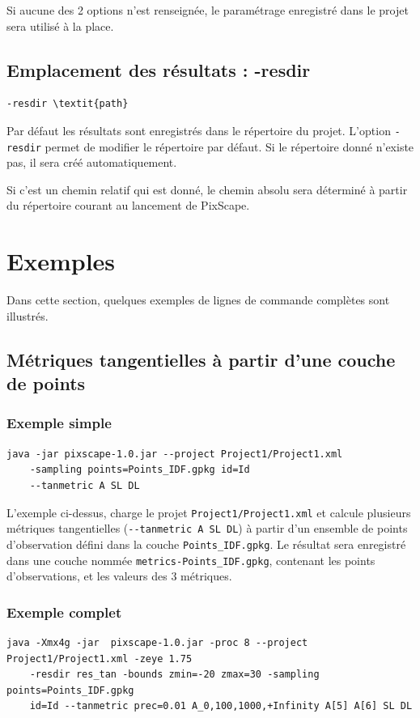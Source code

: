 \documentclass{report}
\begin{document}
Si aucune des 2 options n'est renseignée, le paramétrage enregistré dans le projet sera utilisé à la place.

\subsection{Emplacement des résultats : -resdir}
\begin{Verbatim}[commandchars=\\\{\}]
-resdir \textit{path}
\end{Verbatim}
Par défaut les résultats sont enregistrés dans le répertoire du projet. L'option \verb|-resdir| permet de modifier le répertoire par défaut. 
Si le répertoire donné n'existe pas, il sera créé automatiquement.

Si c'est un chemin relatif qui est donné, le chemin absolu sera déterminé à partir du répertoire courant au lancement de PixScape.

\section{Exemples}

Dans cette section, quelques exemples de lignes de commande complètes sont illustrés.

\subsection{Métriques tangentielles à partir d'une couche de points}
\subsubsection{Exemple simple}
\begin{Verbatim}
java -jar pixscape-1.0.jar --project Project1/Project1.xml 
	-sampling points=Points_IDF.gpkg id=Id 
	--tanmetric A SL DL
\end{Verbatim}

L'exemple ci-dessus, charge le projet \verb|Project1/Project1.xml| et calcule plusieurs métriques tangentielles (\verb|--tanmetric A SL DL|) à partir d'un ensemble de points d'observation défini dans la couche \verb|Points_IDF.gpkg|. Le résultat sera enregistré dans une couche nommée \verb|metrics-Points_IDF.gpkg|, contenant les points d'observations, et les valeurs des 3 métriques.

\subsubsection{Exemple complet}
\begin{Verbatim}
java -Xmx4g -jar  pixscape-1.0.jar -proc 8 --project Project1/Project1.xml -zeye 1.75
	-resdir res_tan -bounds zmin=-20 zmax=30 -sampling points=Points_IDF.gpkg 
	id=Id --tanmetric prec=0.01 A_0,100,1000,+Infinity A[5] A[6] SL DL
\end{Verbatim}
\end{document}
